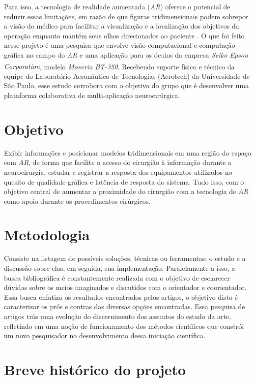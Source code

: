 Para isso, a tecnologia de realidade aumentada (\textit{AR}) oferece o potencial de reduzir essas limitações, em razão de que figuras tridimensionais podem sobrepor a visão do médico para facilitar a visualização e a localização dos objetivos da operação enquanto mantém seus olhos direcionados ao paciente \cite{enhancedvision}. O que foi feito nesse projeto é uma pesquisa que envolve visão computacional e computação gráfica no campo do \textit{AR} e uma aplicação para os óculos da empresa \textit{Seiko Epson Corporation\textsuperscript{\textregistered}}, modelo \textit{Moverio BT-350\texttrademark}. Recebendo suporte físico e técnico da equipe do Laboratório Aeronáutico de Tecnologias (Aerotech) da Universidade de São Paulo, esse estudo corrobora com o objetivo do grupo que é desenvolver uma plataforma colaborativa de multi-aplicação neurocirúrgica. 

\section{Objetivo}

Exibir informações e posicionar modelos tridimensionais em uma região do espaço com \textit{AR}, de forma que facilite o acesso do cirurgião à informação durante a neurocirurgia; estudar e registrar a resposta dos equipamentos utilizados no quesito de qualidade gráfica e latência de resposta do sistema. Tudo isso, com o objetivo central de aumentar a proximidade do cirurgião com a tecnologia de \textit{AR} como apoio durante os procedimentos cirúrgicos.

\section{Metodologia}

Consiste na listagem de possíveis soluções, técnicas ou ferramentas; o estudo e a discussão sobre elas, em seguida, sua implementação. Paralelamente a isso, a busca bibliográfica é constantemente realizada com o objetivo de esclarecer dúvidas sobre os meios imaginados e discutidos com o orientador e coorientador. Essa busca enfatiza os resultados encontrados pelos artigos, o objetivo disto é caracterizar os prós e contras das diversas opções encontradas. Essa pesquisa de artigos trás uma evolução do discernimento dos assuntos do estado da arte, refletindo em uma noção de funcionamento dos métodos científicos que constrói um novo pesquisador no desenvolvimento dessa iniciação científica.

\section{Breve histórico do projeto}

